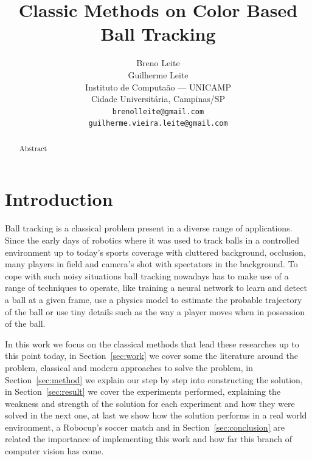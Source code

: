 \documentclass[10pt,twocolumn,letterpaper]{article}
\begin{document}
\title{Classic Methods on Color Based Ball Tracking}

\author{Breno Leite\\ Guilherme Leite\\
Instituto de Computa\cc\~ao --- UNICAMP\\
Cidade Universit\'aria, Campinas/SP\\
{\tt\small brenolleite@gmail.com\\ \tt\small guilherme.vieira.leite@gmail.com}
}

\maketitle

\begin{abstract}
  Abstract
\end{abstract}

\section{Introduction}\label{sec:intro}

  Ball tracking is a classical problem present in a diverse range of
  applications. Since the early days of robotics where it was used to track
  balls in a controlled environment up to today's sports coverage with cluttered
  background, occlusion, many players in field and camera's shot with spectators
  in the background. To cope with such noisy situations ball tracking nowadays
  has to make use of a range of techniques to operate, like training a neural
  network to learn and detect a ball at a given frame, use a physics model to
  estimate the probable trajectory of the ball or use tiny details such as the
  way a player moves when in possession of the ball.

  In this work we focus on the classical methods that lead these researches up
  to this point today, in Section~\ref{sec:work} we cover some the literature
  around the problem, classical and modern approaches to solve the problem, in
  Section~\ref{sec:method} we explain our step by step into constructing the
  solution, in Section~\ref{sec:result} we cover the experiments performed,
  explaining the weakness and strength of the solution for each experiment and
  how they were solved in the next one, at last we show how the solution
  performs in a real world environment, a Robocup's soccer match and in
  Section~\ref{sec:conclusion} are related the importance of implementing this
  work and how far this branch of computer vision has come.
\end{document}
